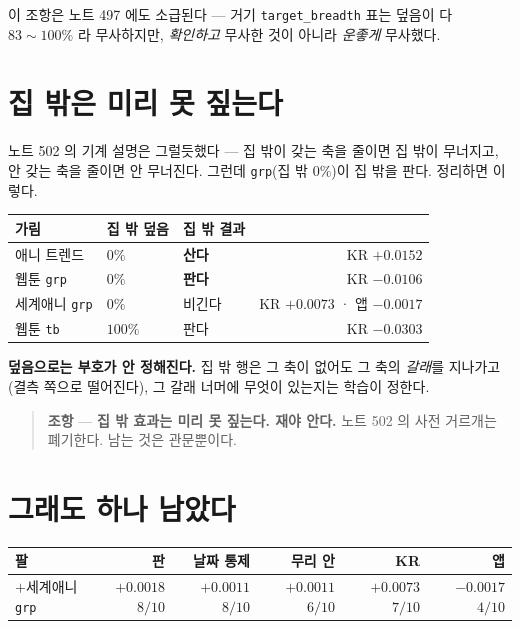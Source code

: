 \documentclass[11pt]{article}
\begin{document}
이 조항은 노트 497 에도 소급된다 --- 거기 \texttt{target\_breadth} 표는
덮음이 다 $83 \sim 100\%$ 라 무사하지만, \emph{확인하고} 무사한 것이 아니라
\emph{운좋게} 무사했다.

\section{집 밖은 미리 못 짚는다}

노트 502 의 기계 설명은 그럴듯했다 --- 집 밖이 갖는 축을 줄이면 집 밖이
무너지고, 안 갖는 축을 줄이면 안 무너진다. 그런데 \texttt{grp}(집 밖
$0\%$)이 집 밖을 판다. 정리하면 이렇다.

\begin{center}
\begin{tabular}{lllr}
\hline
가림 & 집 밖 덮음 & 집 밖 결과 & \\
\hline
애니 트렌드 & $0\%$ & \textbf{산다} & KR $+0.0152$ \\
웹툰 \texttt{grp} & $0\%$ & \textbf{판다} & KR $-0.0106$ \\
세계애니 \texttt{grp} & $0\%$ & 비긴다 & KR $+0.0073$ · 앱 $-0.0017$ \\
웹툰 \texttt{tb} & $100\%$ & 판다 & KR $-0.0303$ \\
\hline
\end{tabular}
\end{center}

\textbf{덮음으로는 부호가 안 정해진다.} 집 밖 행은 그 축이 없어도 그 축의
\emph{갈래}를 지나가고(결측 쪽으로 떨어진다), 그 갈래 너머에 무엇이 있는지는
학습이 정한다.

\begin{quote}
\textbf{조항} --- \textbf{집 밖 효과는 미리 못 짚는다. 재야 안다.}
노트 502 의 사전 거르개는 폐기한다. 남는 것은 관문뿐이다.
\end{quote}

\section{그래도 하나 남았다}

\begin{center}
\begin{tabular}{lrrrrr}
\hline
팔 & 판 & 날짜 통제 & 무리 안 & KR & 앱 \\
\hline
$+$세계애니 \texttt{grp} & $+0.0018$ $8/10$ & $+0.0011$ $8/10$ & $+0.0011$ $6/10$ & $+0.0073$ $7/10$ & $-0.0017$ $4/10$ \\
\hline
\end{tabular}
\end{center}
\end{document}
